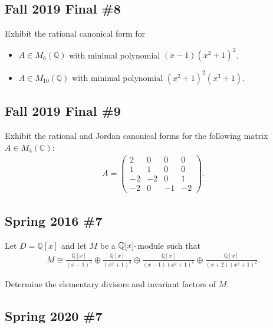 \hypertarget{fall-2019-final-8}{%
\subsection{Fall 2019 Final \#8}\label{fall-2019-final-8}}

Exhibit the rational canonical form for

\begin{itemize}
\tightlist
\item
  \(A\in M_6({\mathbb{Q}})\) with minimal polynomial
  \((x-1)(x^2 + 1)^2\).
\item
  \(A\in M_{10}({\mathbb{Q}})\) with minimal polynomial
  \((x^2+1)^2(x^3 + 1)\).
\end{itemize}

\hypertarget{fall-2019-final-9}{%
\subsection{Fall 2019 Final \#9}\label{fall-2019-final-9}}

Exhibit the rational and Jordan canonical forms for the following matrix
\(A\in M_4({\mathbb{C}})\):
\begin{align*}
  A=\left(\begin{array}{cccc}
  2 & 0 & 0 & 0 \\
  1 & 1 & 0 & 0 \\
  -2 & -2 & 0 & 1 \\
  -2 & 0 & -1 & -2
  \end{array}\right)
  .\end{align*}

\hypertarget{spring-2016-7}{%
\subsection{Spring 2016 \#7}\label{spring-2016-7}}

Let \(D = {\mathbb{Q}}[x]\) and let \(M\) be a
\({\mathbb{Q}}[x]{\hbox{-}}\)module such that
\begin{align*}
M \cong \frac{\mathbb{Q}[x]}{(x-1)^{3}} \oplus \frac{\mathbb{Q}[x]}{\left(x^{2}+1\right)^{3}} \oplus \frac{\mathbb{Q}[x]}{(x-1)\left(x^{2}+1\right)^{5}} \oplus \frac{\mathbb{Q}[x]}{(x+2)\left(x^{2}+1\right)^{2}}
.\end{align*}

Determine the elementary divisors and invariant factors of \(M\).

\hypertarget{spring-2020-7}{%
\subsection{Spring 2020 \#7}\label{spring-2020-7}}

